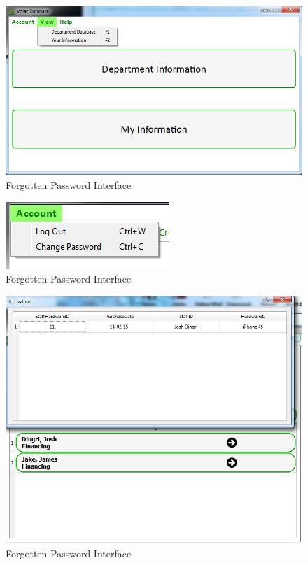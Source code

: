\begin{figure}[H]
    \includegraphics[width=\textwidth]{./Testing/Images/ViewMenu.png}
    \caption{Forgotten Password Interface} \label{fig:ViewMenu}
\end{figure}

\begin{figure}[H]
    \includegraphics[width=\textwidth]{./Testing/Images/AccountMenu.png}
    \caption{Forgotten Password Interface} \label{fig:AccountMenu}
\end{figure}

\begin{figure}[H]
    \includegraphics[width=\textwidth]{./Testing/Images/SearchStaffButtons.png}
    \caption{Forgotten Password Interface} \label{fig:SearchStaffButtons}
\end{figure}

